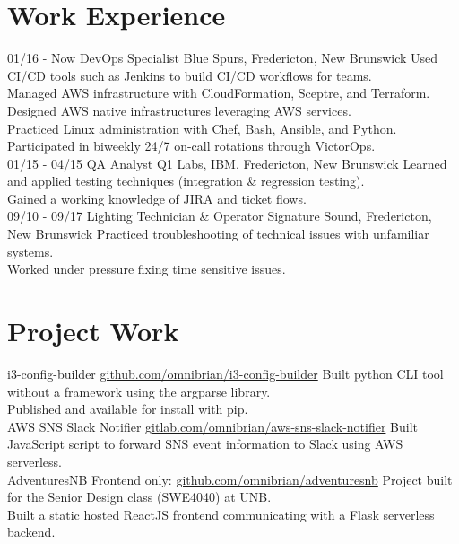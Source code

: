 \documentclass[a4paper]{resume}
\begin{document}
\section{Work Experience}
\begin{entrylist}
  \entry
    {01/16 - Now}
    {DevOps Specialist}
    {Blue Spurs, Fredericton, New Brunswick}
    {Used CI/CD tools such as Jenkins to build CI/CD workflows for teams.\\
    Managed AWS infrastructure with CloudFormation, Sceptre, and Terraform.\\
    Designed AWS native infrastructures leveraging AWS services.\\
    Practiced Linux administration with Chef, Bash, Ansible, and Python.\\
    Participated in biweekly 24/7 on-call rotations through VictorOps.\\}
  \entry
    {01/15 - 04/15}
    {QA Analyst}
    {Q1 Labs, IBM, Fredericton, New Brunswick}
    {Learned and applied testing techniques (integration \& regression testing).\\
    Gained a working knowledge of JIRA and ticket flows.\\}
  \entry
    {09/10 - 09/17}
    {Lighting Technician \& Operator}
    {Signature Sound, Fredericton, New Brunswick}
    {Practiced troubleshooting of technical issues with unfamiliar systems.\\
    Worked under pressure fixing time sensitive issues.}
\end{entrylist}

\section{Project Work}
\begin{entrylist}
  \wideentry
    {i3-config-builder}
    {\href{https://github.com/omnibrian/i3-config-builder}{github.com/omnibrian/i3-config-builder}}
    {Built python CLI tool without a framework using the argparse library.\\
    Published and available for install with pip.\\}
  \wideentry
    {AWS SNS Slack Notifier}
    {\href{https://gitlab.com/omnibrian/aws-sns-slack-notifier}{gitlab.com/omnibrian/aws-sns-slack-notifier}}
    {Built JavaScript script to forward SNS event information to Slack using AWS serverless.\\}
  \wideentry
    {AdventuresNB}
    {Frontend only: \href{https://github.com/omnibrian/adventuresnb}{github.com/omnibrian/adventuresnb}}
    {Project built for the Senior Design class (SWE4040) at UNB.\\
    Built a static hosted ReactJS frontend communicating with a Flask serverless backend.}
\end{entrylist}
\end{document}
